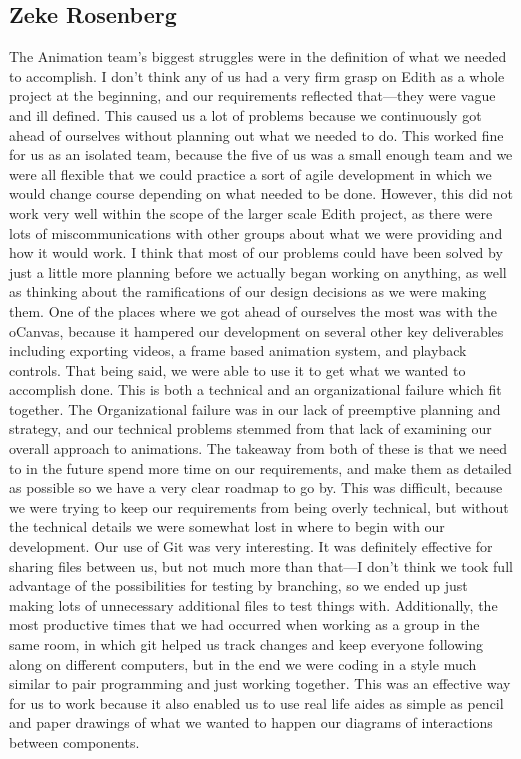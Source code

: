 \documentclass[12pt]{article}
\begin{document}
\subsection{Zeke Rosenberg}
\begin{changemargin}{1cm}{0cm} 
The Animation team’s biggest struggles were in the definition of what we needed to accomplish. I don’t think any of us had a very firm grasp on Edith as a whole project at the beginning, and our requirements reflected that—they were vague and ill defined. This caused us a lot of problems because we continuously got ahead of ourselves without planning out what we needed to do. This worked fine for us as an isolated team, because the five of us was a small enough team and we were all flexible that we could practice a sort of agile development in which we would change course depending on what needed to be done. However, this did not work very well within the scope of the larger scale Edith project, as there were lots of miscommunications with other groups about what we were providing and how it would work. 
	I think that most of our problems could have been solved by just a little more planning before we actually began working on anything, as well as thinking about the ramifications of our design decisions as we were making them. One of the places where we got ahead of ourselves the most was with the oCanvas, because it hampered our development on several other key deliverables including exporting videos, a frame based animation system, and playback controls. That being said, we were able to use it to get what we wanted to accomplish done. This is both a technical and an organizational failure which fit together. The Organizational failure was in our lack of preemptive planning and strategy, and our technical problems stemmed from that lack of examining our overall approach to animations. The takeaway from both of these is that we need to in the future spend more time on our requirements, and make them as detailed as possible so we have a very clear roadmap to go by. This was difficult, because we were trying to keep our requirements from being overly technical, but without the technical details we were somewhat lost in where to begin with our development. 
	Our use of Git was very interesting. It was definitely effective for sharing files between us, but not much more than that—I don’t think we took full advantage of the possibilities for testing by branching, so we ended up just making lots of unnecessary additional files to test things with. Additionally, the most productive times that we had occurred when working as a group in the same room, in which git helped us track changes and keep everyone following along on different computers, but in the end we were coding in a style much similar to pair programming and just working together. This was an effective way for us to work because it also enabled us to use real life aides as simple as pencil and paper drawings of what we wanted to happen our diagrams of interactions between components. 

\end{changemargin}
\end{document}
